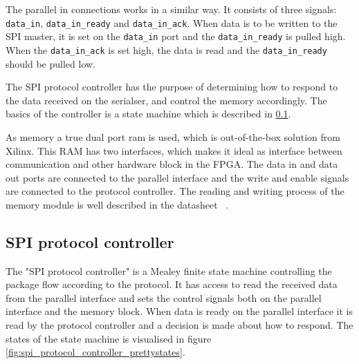 The parallel in connections works in a similar way. It consists of three signals: \texttt{data\_in}, \texttt{data\_in\_ready} and \texttt{data\_in\_ack}. When data is to be written to the SPI master, it is set on the \texttt{data\_in} port and the \texttt{data\_in\_ready} is pulled high. When the \texttt{data\_in\_ack} is set high, the data is read and the \texttt{data\_in\_ready} should be pulled low.

The SPI protocol controller has the purpose of determining how to respond to the data received on the serialser, and control the memory accordingly. The basics of the controller is a state machine which is described in \ref{spi_protocol_controller}.

As memory a true dual port ram is used, which is out-of-the-box solution from Xilinx. This RAM has two interfaces, which makes it ideal as interface between communication and other hardware block in the FPGA. The data in and data out ports are connected to the parallel interface and the write and enable signals are connected to the protocol controller. The reading and writing process of the memory module is well described in the datasheet ~\cite{XILINX_MEM}.

\subsection{SPI protocol controller}
\label{spi_protocol_controller}
The "SPI protocol controller" is a Mealey finite state machine controlling the package flow according to the protocol. It has access to read the received data from the parallel interface and sets the control signals both on the parallel interface and the memory block. When data is ready on the parallel interface it is read by the protocol controller and a decision is made about how to respond. The states of the state machine is visualised in figure \ref{fig:spi_protocol_controller_prettystates}.


